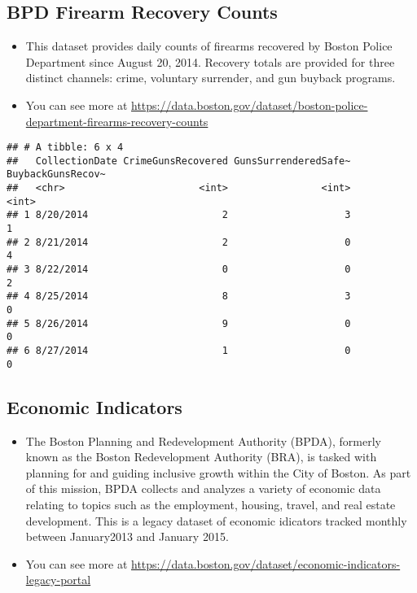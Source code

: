 \documentclass[]{article}
\begin{document}
\subsection{BPD Firearm Recovery
Counts}\label{bpd-firearm-recovery-counts}

\begin{itemize}
\item
  This dataset provides daily counts of firearms recovered by Boston
  Police Department since August 20, 2014. Recovery totals are provided
  for three distinct channels: crime, voluntary surrender, and gun
  buyback programs.
\item
  You can see more at
  \url{https://data.boston.gov/dataset/boston-police-department-firearms-recovery-counts}
\end{itemize}

\begin{verbatim}
## # A tibble: 6 x 4
##   CollectionDate CrimeGunsRecovered GunsSurrenderedSafe~ BuybackGunsRecov~
##   <chr>                       <int>                <int>             <int>
## 1 8/20/2014                       2                    3                 1
## 2 8/21/2014                       2                    0                 4
## 3 8/22/2014                       0                    0                 2
## 4 8/25/2014                       8                    3                 0
## 5 8/26/2014                       9                    0                 0
## 6 8/27/2014                       1                    0                 0
\end{verbatim}

\subsection{Economic Indicators}\label{economic-indicators}

\begin{itemize}
\item
  The Boston Planning and Redevelopment Authority (BPDA), formerly known
  as the Boston Redevelopment Authority (BRA), is tasked with planning
  for and guiding inclusive growth within the City of Boston. As part of
  this mission, BPDA collects and analyzes a variety of economic data
  relating to topics such as the employment, housing, travel, and real
  estate development. This is a legacy dataset of economic idicators
  tracked monthly between January2013 and January 2015.
\item
  You can see more at
  \url{https://data.boston.gov/dataset/economic-indicators-legacy-portal}
\end{itemize}
\end{document}
